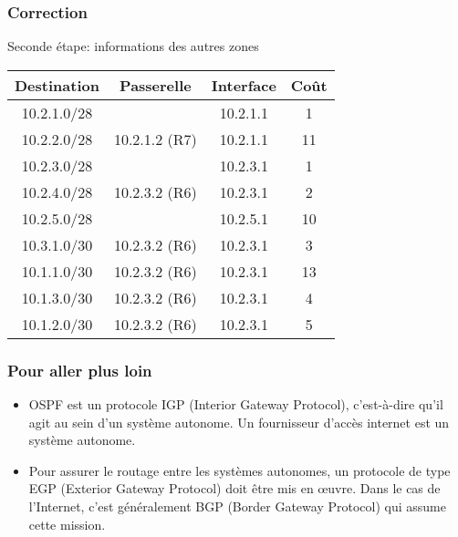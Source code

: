 \documentclass[svgnames,11pt]{beamer}
\begin{document}
\begin{frame}
    \frametitle{Correction}
    Seconde étape: informations des autres zones
    \begin{center}
        \begin{tabular}{|*{4}{c|}}
            \hline
            Destination & Passerelle    & Interface & Coût \\
            \hline
            10.2.1.0/28 &               & 10.2.1.1  & 1    \\
            \hline
            10.2.2.0/28 & 10.2.1.2 (R7) & 10.2.1.1  & 11    \\
            \hline
            10.2.3.0/28 &               & 10.2.3.1  & 1   \\
            \hline
            10.2.4.0/28 & 10.2.3.2 (R6) & 10.2.3.1  & 2    \\
            \hline
            10.2.5.0/28 &  & 10.2.5.1  & 10    \\
            \hline
            10.3.1.0/30 & 10.2.3.2 (R6) & 10.2.3.1  & 3    \\
            \hline
            10.1.1.0/30 & 10.2.3.2 (R6) & 10.2.3.1  & 13    \\
            \hline
            10.1.3.0/30 & 10.2.3.2 (R6) & 10.2.3.1  & 4    \\
            \hline
            10.1.2.0/30 & 10.2.3.2 (R6) & 10.2.3.1  & 5    \\
            \hline
        \end{tabular}
    \end{center}

\end{frame}

\begin{frame}
    \frametitle{Pour aller plus loin}

    \begin{itemize}
        \item<1-> OSPF est un protocole IGP (Interior Gateway Protocol), c'est-à-dire qu'il agit au sein d'un système autonome. Un fournisseur d'accès internet est un système autonome.
        \item<2-> Pour assurer le routage entre les systèmes autonomes, un protocole de type EGP (Exterior Gateway Protocol) doit être mis en œuvre. Dans le cas de l'Internet, c'est généralement BGP (Border Gateway Protocol) qui assume cette mission.
    \end{itemize}

\end{frame}
\end{document}
